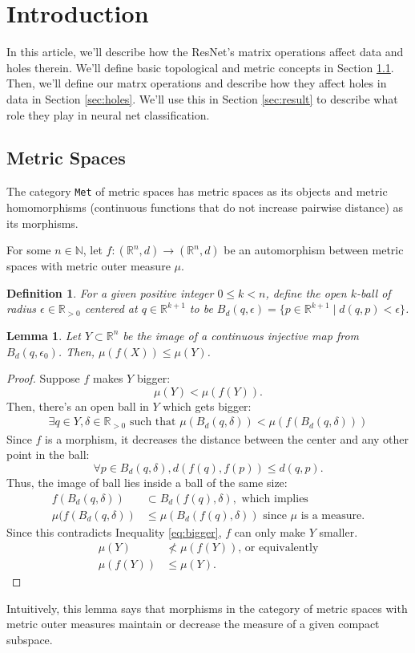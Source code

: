 \documentclass{article}
\newtheorem{definition}{Definition}
\newtheorem{lemma}{Lemma}
\newcommand{\N}{\mathbb{N}}
\newcommand{\R}{\mathbb{R}}
\begin{document}
\section{Introduction}\label{sec:intro}
In this article, we'll describe how the ResNet's matrix operations affect data and holes therein.
We'll define basic topological and metric concepts in Section \ref{sec:metric}.
Then, we'll define our matrx operations and describe how they affect holes in data in Section \ref{sec:holes}.
We'll use this in Section \ref{sec:result} to describe what role they play in neural net classification.

\subsection{Metric Spaces}\label{sec:metric}
The category \texttt{Met} of metric spaces has metric spaces as its objects and metric homomorphisms (continuous functions that do not increase pairwise distance) as its morphisms.

For some $n\in\N$, let $f:(\R^n,d)\to(\R^n,d)$ be an automorphism between metric spaces with metric outer measure $\mu$.

\begin{definition}
For a given positive integer $0\le k<n$, define the \emph{open $k$-ball} of radius $\epsilon\in\R_{>0}$ centered at $q\in\R^{k+1}$ to be $B_d(q,\epsilon)=\{p\in\R^{k+1} \mid d(q,p)< \epsilon \}$.
\end{definition}

\begin{lemma}\label{lem:bigger}
Let $Y\subset \R^n$ be the image of a continuous injective map from $B_d(q,\epsilon_0)$. Then, $\mu(f(X))\le \mu(Y)$.
\end{lemma}
\begin{proof}
Suppose $f$ makes $Y$ bigger:
$$\mu(Y)<\mu(f(Y)).$$
Then, there's an open ball in $Y$ which gets bigger:
\begin{align}\label{eq:bigger}
    \exists q\in Y, \delta\in \R_{>0} \text{ such that } \mu(B_d(q,\delta))< \mu(f(B_d(q,\delta)))
\end{align}
Since $f$ is a morphism, it decreases the distance between the center and any other point in the ball:
$$\forall p\in B_d(q,\delta),  d(f(q), f(p))\le d(q,p).$$
Thus, the image of ball lies inside a ball of the same size:
\begin{align*}
    f(B_d(q,\delta)) &\subset B_d(f(q), \delta), \text{ which implies }\\
    \mu(f(B_d(q,\delta)) &\le \mu(B_d(f(q), \delta)) \text{ since $\mu$ is a measure.}
\end{align*}
Since this contradicts Inequality \ref{eq:bigger}, $f$ can only make $Y$ smaller.
\begin{align*}
    \mu(Y) &\nless \mu(f(Y)) \text{, or equivalently} \\
    \mu(f(Y)) &\le \mu(Y).
\end{align*}
\end{proof}
Intuitively, this lemma says that morphisms in the category of metric spaces with metric outer measures maintain or decrease the measure of a given compact subspace.
\end{document}
